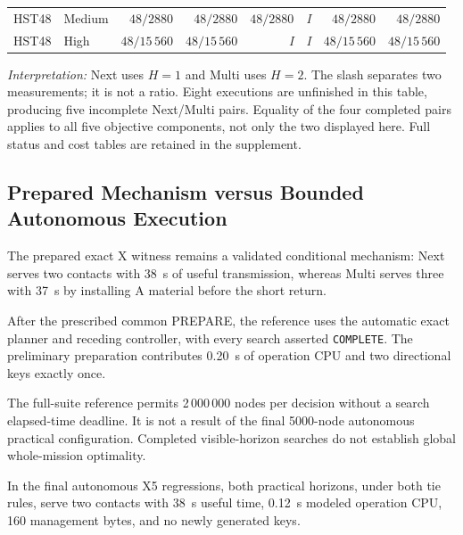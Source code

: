 \documentclass[conference]{IEEEtran}
\newcommand{\op}[1]{\texttt{#1}}
\newcommand{\missing}{\textit{I}}
\begin{document}
\begin{table}[!t]
\begin{tabular*}{\textwidth}{
        @{\extracolsep{\fill}}
        llrrrrrr
        @{}
    }
        HST48
        & Medium
        & $48/2880$
        & $48/2880$
        & $48/2880$
        & \missing
        & $48/2880$
        & $48/2880$ \\

        HST48
        & High
        & $48/15\,560$
        & $48/15\,560$
        & \missing
        & \missing
        & $48/15\,560$
        & $48/15\,560$ \\

        \bottomrule
    \end{tabular*}

    \vspace{4pt}

    \begin{minipage}{0.98\textwidth}
        \footnotesize
        \emph{Interpretation:}
        Next uses $H=1$ and Multi uses $H=2$.
        The slash separates two measurements; it is not a ratio.
        Eight executions are unfinished in this table, producing
        five incomplete Next/Multi pairs.
        Equality of the four completed pairs applies to all five
        objective components, not only the two displayed here.
        Full status and cost tables are retained in the supplement.
    \end{minipage}
\end{table}

\subsection{Prepared Mechanism versus Bounded Autonomous Execution}

The prepared exact X witness remains a validated conditional
mechanism:
Next serves two contacts with 38~s of useful transmission,
whereas Multi serves three with 37~s by installing A material
before the short return.

After the prescribed common PREPARE, the reference uses the
automatic exact planner and receding controller, with every
search asserted \op{COMPLETE}.
The preliminary preparation contributes 0.20~s of operation CPU
and two directional keys exactly once.

The full-suite reference permits 2\,000\,000 nodes per decision
without a search elapsed-time deadline.
It is not a result of the final 5000-node autonomous practical
configuration.
Completed visible-horizon searches do not establish global
whole-mission optimality.

In the final autonomous X5 regressions, both practical horizons,
under both tie rules, serve two contacts with 38~s useful time,
0.12~s modeled operation CPU, 160 management bytes,
and no newly generated keys.
\end{document}
